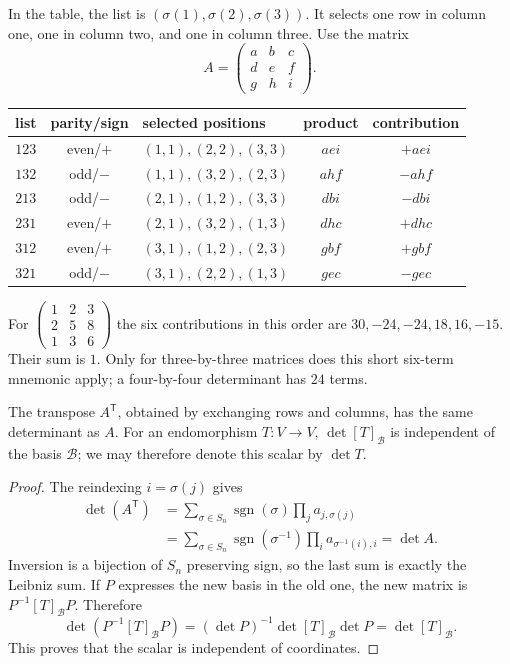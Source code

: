 \begin{example}
In the table, the list is $(\sigma(1),\sigma(2),\sigma(3))$.
It selects one row in column one, one in column two, and one in column
three. Use the matrix
\[
A=\begin{pmatrix}a&b&c\\d&e&f\\g&h&i\end{pmatrix}.
\]
\begin{center}
\begin{tabular}{cclcc}
list & parity/sign & selected positions & product & contribution\\\hline
$123$ & even/$+$ & $(1,1),(2,2),(3,3)$ & $aei$ & $+aei$\\
$132$ & odd/$-$ & $(1,1),(3,2),(2,3)$ & $ahf$ & $-ahf$\\
$213$ & odd/$-$ & $(2,1),(1,2),(3,3)$ & $dbi$ & $-dbi$\\
$231$ & even/$+$ & $(2,1),(3,2),(1,3)$ & $dhc$ & $+dhc$\\
$312$ & even/$+$ & $(3,1),(1,2),(2,3)$ & $gbf$ & $+gbf$\\
$321$ & odd/$-$ & $(3,1),(2,2),(1,3)$ & $gec$ & $-gec$
\end{tabular}
\end{center}
For $\left(\begin{matrix}1&2&3\\2&5&8\\1&3&6\end{matrix}\right)$
the six contributions in this order are $30,-24,-24,18,16,-15$.
Their sum is $1$. Only for three-by-three matrices does this short
six-term mnemonic apply; a four-by-four determinant has $24$ terms.
\end{example}
\begin{proposition}
\label{prop:transpose-intrinsic-det}
The transpose $A^{\mathsf T}$, obtained by exchanging rows and columns,
has the same determinant as $A$. For an endomorphism $T:V\to V$,
$\det[T]_{\mathcal B}$ is independent of the basis $\mathcal B$;
we may therefore denote this scalar by $\det T$.
\end{proposition}
\begin{proof}
The reindexing $i=\sigma(j)$ gives
\[
\begin{aligned}
\det(A^{\mathsf T})
&=\sum_{\sigma\in S_n}\operatorname{sgn}(\sigma)\prod_j a_{j,\sigma(j)}\\
&=\sum_{\sigma\in S_n}\operatorname{sgn}(\sigma^{-1})
\prod_i a_{\sigma^{-1}(i),i}=\det A.
\end{aligned}
\]
Inversion is a bijection of $S_n$ preserving sign, so the last sum is
exactly the Leibniz sum. If $P$ expresses the new basis in the old one,
the new matrix is $P^{-1}[T]_{\mathcal B}P$. Therefore
\[
\det(P^{-1}[T]_{\mathcal B}P)
=(\det P)^{-1}\det[T]_{\mathcal B}\det P=\det[T]_{\mathcal B}.
\]
This proves that the scalar is independent of coordinates.
\end{proof}
